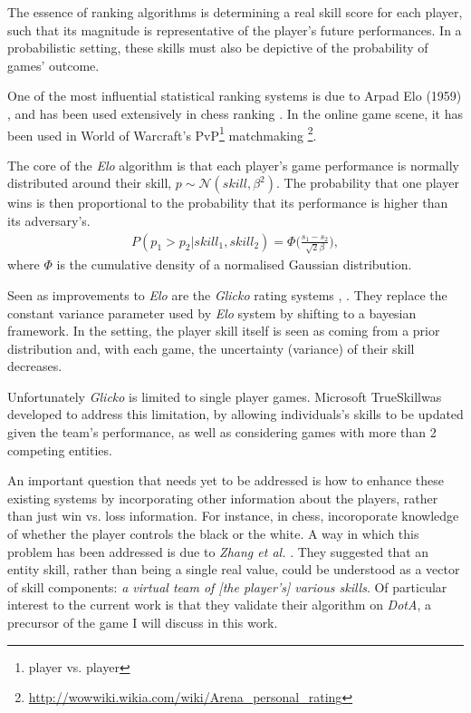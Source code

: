 \documentclass[10pt,a4]{article}
\begin{document}
The essence of ranking algorithms is determining a real skill score for each 
player, such that its magnitude is representative of the player's future 
performances. In a probabilistic setting, these skills must also be depictive of 
the probability of games' outcome.

One of the most influential statistical ranking systems is due to Arpad Elo (1959) 
\cite{elo1978rating}, and has been used extensively in chess ranking 
\cite{glickman1995comprehensive}. In the online game scene, it has been used in 
World of Warcraft's PvP\footnote{player vs. player} matchmaking 
\footnote{\url{http://wowwiki.wikia.com/wiki/Arena_personal_rating}}. 

The core of the \emph{Elo} algorithm is that each player's game performance  
is normally distributed around their skill, $p \sim \mathcal{N}(skill, \beta^2)$.
The probability that one player wins is then proportional to the probability that 
its performance is higher than its adversary's.
\begin{align*}
	P(p_1 > p_2 | skill_1, skill_2) = \Phi\bigg(\frac{s_1 - s_2}{\sqrt{2}\beta}\bigg),
\end{align*}
where $\Phi$ is the cumulative density of a normalised Gaussian distribution. 


Seen as improvements to \emph{Elo} are the \emph{Glicko} rating systems \cite{glickman1999parameter},
\cite{glickman2012example}. They replace the constant variance parameter used by 
\emph{Elo} system by shifting to a bayesian framework. In the setting, the player skill itself 
is seen as coming from a prior distribution and, with each game, the uncertainty 
(variance) of their skill decreases. 

Unfortunately \emph{Glicko} is limited to single player games. Microsoft 
TrueSkill\texttrademark  was developed to address this limitation, by allowing 
individuals's skills to be updated given the team's performance, as well as considering
games with more than 2 competing entities.

An important question that needs yet to be addressed is how to enhance these existing
systems by incorporating other information about the players, rather than just 
win vs. loss information. For instance, in chess, incoroporate knowledge of whether 
the player controls the black or the white. 
A way in which this problem has been addressed is due to \emph{Zhang et al.} 
\cite{zhang2010factor}. They suggested that an entity skill, rather than being 
a single real value, could be understood as a vector of skill components: \emph{
a virtual team of [the player's] various skills}. Of particular interest to the 
current work is that they validate their algorithm on \emph{DotA}, a precursor of 
the game I will discuss in this work.
\end{document}
